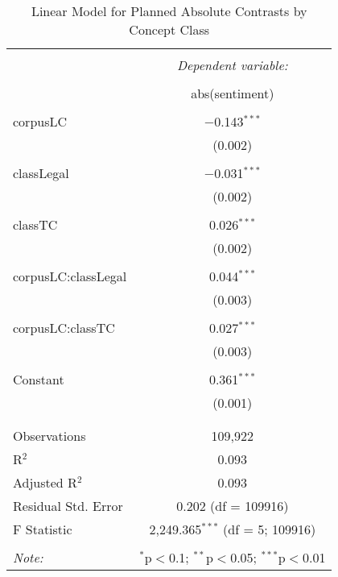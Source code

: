 \documentclass{article}
\begin{document}
\begin{table}[!htbp] \centering 
\begin{tabular}{@{\extracolsep{5pt}}lc} 
\\[-1.8ex]\hline 
\hline \\[-1.8ex] 
 & \multicolumn{1}{c}{\textit{Dependent variable:}} \\ 
\cline{2-2} 
\\[-1.8ex] & abs(sentiment) \\ 
\hline \\[-1.8ex] 
 corpusLC & $-$0.143$^{***}$ \\ 
  & (0.002) \\ 
  & \\ 
 classLegal & $-$0.031$^{***}$ \\ 
  & (0.002) \\ 
  & \\ 
 classTC & 0.026$^{***}$ \\ 
  & (0.002) \\ 
  & \\ 
 corpusLC:classLegal & 0.044$^{***}$ \\ 
  & (0.003) \\ 
  & \\ 
 corpusLC:classTC & 0.027$^{***}$ \\ 
  & (0.003) \\ 
  & \\ 
 Constant & 0.361$^{***}$ \\ 
  & (0.001) \\ 
  & \\ 
\hline \\[-1.8ex] 
Observations & 109,922 \\ 
R$^{2}$ & 0.093 \\ 
Adjusted R$^{2}$ & 0.093 \\ 
Residual Std. Error & 0.202 (df = 109916) \\ 
F Statistic & 2,249.365$^{***}$ (df = 5; 109916) \\ 
\hline 
\hline \\[-1.8ex] 
\textit{Note:}  & \multicolumn{1}{r}{$^{*}$p$<$0.1; $^{**}$p$<$0.05; $^{***}$p$<$0.01} \\ 
\end{tabular}
\caption{Linear Model for Planned Absolute Contrasts by Concept Class} 
\label{tab:s1m3lm} 
\end{table} 
\end{document}
